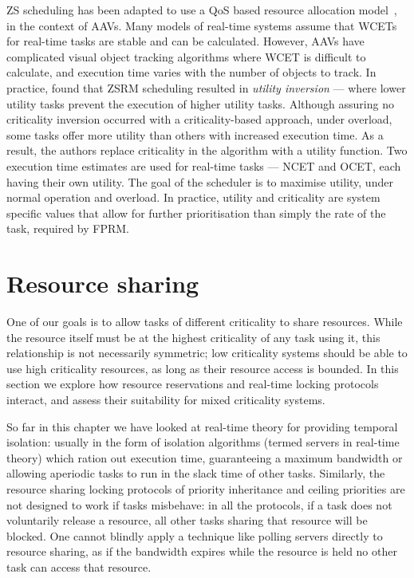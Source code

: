 \gls{ZS} scheduling has been adapted to use a \gls{QoS} based resource allocation
model~\citep{deNiz_WSRR_12}, in the context of \glspl{AAV}. Many models of real-time systems assume
that \glspl{WCET} for real-time tasks are stable and can be calculated.  However, \glspl{AAV} have
complicated visual object tracking algorithms where \gls{WCET} is difficult to calculate, and
execution time varies with the number of objects to track.  In practice,  found
that \gls{ZS}\gls{RM} scheduling resulted in \emph{utility inversion} --- where lower utility tasks
prevent the execution of higher utility tasks.  Although assuring no criticality inversion occurred
with a criticality-based approach, under overload, some tasks offer more utility than others with
increased execution time.  As a result, the authors replace criticality in the algorithm with a
utility function.  Two execution time estimates are used for real-time tasks --- \gls{NCET} and
\gls{OCET}, each having their own utility.  The goal of the scheduler is to maximise utility, under
normal operation and overload. In practice, utility and criticality are system specific values that
allow for further prioritisation than simply the rate of the task, required by \gls{FPRM}.

\section{Resource sharing}

One of our goals is to allow tasks of different criticality to share resources.  While the resource
itself must be at the highest criticality of any task using it, this relationship is not
necessarily symmetric; low criticality systems should be able to use high criticality resources, as
long as their resource access is bounded. 
In this section we explore how resource reservations and real-time locking protocols interact, and
assess their suitability for mixed criticality systems.

So far in this chapter we have looked at real-time
theory for providing temporal isolation: usually in the form of isolation algorithms (termed servers
in real-time theory) which
ration out execution time, guaranteeing a maximum bandwidth or allowing aperiodic tasks to run in
the slack time of other tasks. Similarly, the resource sharing locking protocols of priority
inheritance and ceiling priorities are not designed to work if tasks misbehave: in all the
protocols, if a
task does not voluntarily release a resource, all other tasks sharing that resource will be
blocked. One cannot blindly apply a technique like polling servers directly to resource sharing, as if the
bandwidth expires while the resource is held no other task can access that resource.


